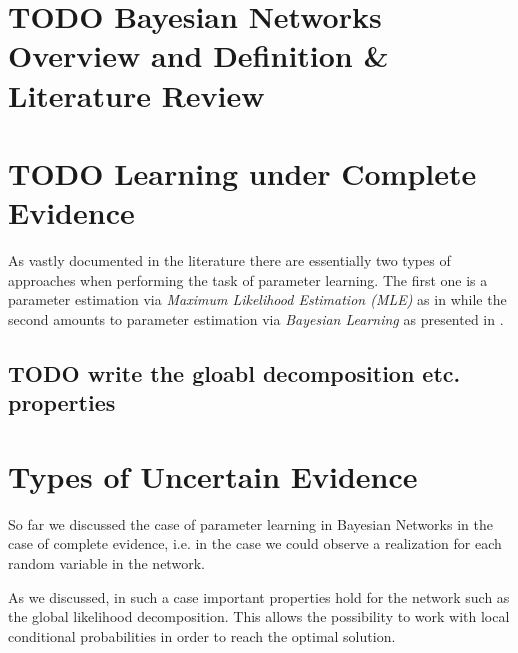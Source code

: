 \documentclass[11pt]{article}
\begin{document}
\begin{article}

\maketitle

\newpage

\tableofcontents

\newpage

\listoffigures
\listofalgorithms
\listoftables

\newpage

\section{{\bfseries\sffamily TODO} Bayesian Networks Overview and Definition \& Literature Review}
\label{sec:org0ab371f}


\section{{\bfseries\sffamily TODO} Learning under Complete Evidence}
\label{complete-learning}
As vastly documented in the literature there are essentially two
types of approaches when performing the task of parameter
learning. The first one is a parameter estimation via \emph{Maximum
Likelihood Estimation (MLE)} as in \cite{Myung_2003} while the second
amounts to parameter estimation via \emph{Bayesian Learning} as presented
in \cite{Smith_2001}.


\subsection{{\bfseries\sffamily TODO} write the gloabl decomposition etc. properties}
\label{sec:orgcafdfa9}


\section{Types of Uncertain Evidence}
\label{sec:orga1cb782}

So far we discussed the case of parameter learning in Bayesian
Networks in the case of complete evidence, i.e. in the case we could
observe a realization for each random variable in the network.

As we discussed, in such a case important properties hold for the
network such as the global likelihood decomposition. This allows the
possibility to work with local conditional probabilities in order to
reach the optimal solution.


\end{article}
\end{document}
